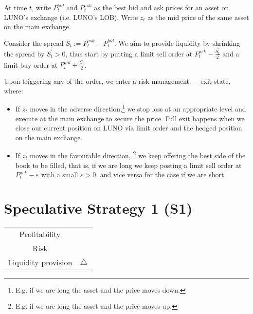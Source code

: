 \documentclass[12pt,a4paper]{article}
\begin{document}
At time $t$, write $P^{bid}_t$ and $P^{ask}_t$ as the best bid and ask prices for an asset on LUNO's exchange (i.e. LUNO's LOB). Write $z_t$ as the mid price of the same asset on the main exchange.

Consider the spread $S_t := P^{ask}_t - P^{bid}_t$. We aim to provide liquidity by shrinking the spread by $S_t^\prime >0$, thus start by putting a limit sell order at $P^{ask}_t - \frac{S_t^\prime}{2}$ and a limit buy order at $P^{bid}_t + \frac{S_t^\prime}{2}$.

Upon triggering any of the order, we enter a risk management --- exit state, where: \begin{itemize}
	\item If $z_t$ moves in the adverse direction,\footnote{E.g. if we are long the asset and the price moves down.} we stop loss at an appropriate level and execute at the main exchange to secure the price. Full exit happens when we close our current position on LUNO via limit order and the hedged position on the main exchange.
	\item If $z_t$ moves in the favourable direction, \footnote{E.g. if we are long the asset and the price moves up.} we keep offering the best side of the book to be filled, that is, if we are long we keep posting a limit sell order at $P^{ask}_t - \varepsilon$ with a small $\varepsilon > 0$, and vice versa for the case if we are short.
\end{itemize}



\vfill

\pagebreak

\section{Speculative Strategy 1 (S1)}

\begin{table}[h]
	\centering
	\begin{tabular}{c|c}
		
		Profitability& \textdollaroldstyle \textdollaroldstyle \textdollaroldstyle \\
		
		Risk & \Radioactivity  \Radioactivity \Radioactivity \\
		
		Liquidity provision &$ \bigtriangleup$\\
		
	\end{tabular}
\end{table}
\end{document}
